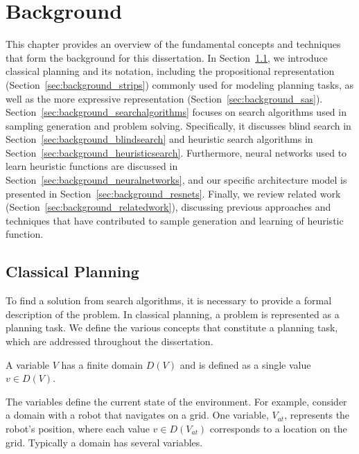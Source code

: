 \chapter{Background}
\label{sec:preliminaries}

This chapter provides an overview of the fundamental concepts and techniques that form the background for this dissertation. In Section~\ref{sec:background_classicalplanning}, we introduce classical planning and its notation, including the propositional representation (Section~\ref{sec:background_strips}) commonly used for modeling planning tasks, as well as the more expressive \sas representation (Section~\ref{sec:background_sas}). Section~\ref{sec:background_searchalgorithms} focuses on search algorithms used in sampling generation and problem solving. Specifically, it discusses blind search in Section~\ref{sec:background_blindsearch} and heuristic search algorithms in Section~\ref{sec:background_heuristicsearch}. Furthermore, neural networks used to learn heuristic functions are discussed in Section~\ref{sec:background_neuralnetworks}, and our specific architecture model is presented in Section~\ref{sec:background_resnets}. Finally, we review related work (Section~\ref{sec:background_relatedwork}), discussing previous approaches and techniques that have contributed to sample generation and learning of heuristic function.

\section{Classical Planning}
\label{sec:background_classicalplanning}

To find a solution from search algorithms, it is necessary to provide a formal description of the problem. In classical planning, a problem is represented as a planning task. We define the various concepts that constitute a planning task, which are addressed throughout the dissertation.

\begin{definition}[Variable]\label{def:variable}
    A variable $V$ has a finite domain $D(V)$ and is defined as a single value $v \in D(V)$.
\end{definition}

The variables define the current state of the environment. For example, consider a domain with a robot that navigates on a grid. One variable, $V_{at}$, represents the robot's position, where each value $v \in D(V_{at})$ corresponds to a location on the grid. Typically a domain has several variables.

